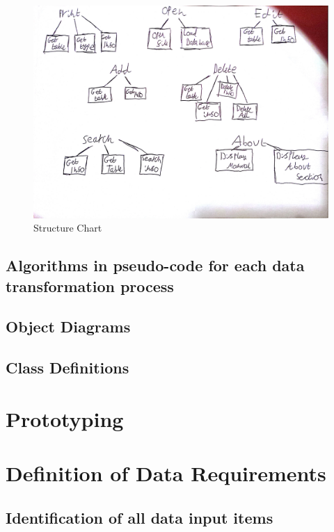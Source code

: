 \begin{figure}[H]
    \includegraphics[width=\textwidth]{StructureChart2.jpg}
    \caption{Structure Chart} \label{fig:StructureChart}
\end{figure}



\subsection{Algorithms in pseudo-code for each data transformation process}

\subsection{Object Diagrams}

\subsection{Class Definitions}

\section{Prototyping}

\section{Definition of Data Requirements}

\subsection{Identification of all data input items}

